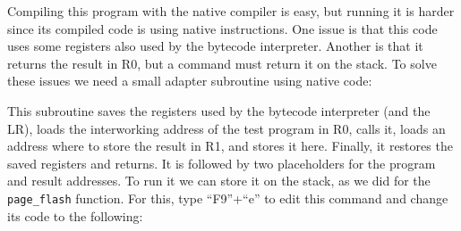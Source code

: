 
Compiling this program with the native compiler is easy, but running it is
harder since its compiled code is using native instructions. One issue is that
this code uses some registers also used by the bytecode interpreter. Another is
that it returns the result in R0, but a command must return it on the stack. To
solve these issues we need a small adapter subroutine using native code:



This subroutine saves the registers used by the bytecode interpreter (and the
LR), loads the interworking address of the test program in R0, calls it, loads
an address where to store the result in R1, and stores it here. Finally, it
restores the saved registers and returns. It is followed by two placeholders
for the program and result addresses. To run it we can store it on the stack,
as we did for the {\tt page\_flash} function. For this, type ``F9''+``e'' to
edit this command and change its code to the following:

